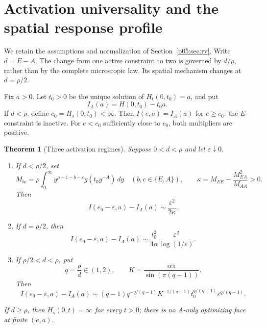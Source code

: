 \documentclass[11pt,letterpaper]{article}
\newtheorem{theorem}{Theorem}[section]
\theoremstyle{definition}
\theoremstyle{remark}
\newcommand{\1}{\mathbf 1}
\begin{document}
\section{Activation universality and the spatial response profile}
\label{p05:sec:activation}

We retain the assumptions and normalization of Section~\ref{p05:sec:rv}.
Write $d=E-A$. The change from one active constraint to two is governed
by $d/\rho$, rather than by the complete microscopic law. Its spatial
mechanism changes at $d=\rho/2$.

Fix $a>0$. Let $t_0>0$ be the unique solution of
$H_t(0,t_0)=a$, and put
\[
 I_A(a)=H(0,t_0)-t_0a.
\]
If $d<\rho$, define $e_0=H_s(0,t_0)<\infty$. Then
$I(e,a)=I_A(a)$ for $e\ge e_0$: the $E$-constraint is inactive.
For $e<e_0$ sufficiently close to $e_0$, both multipliers are positive.

\begin{theorem}[Three activation regimes]\label{p05:thm:activation}
Suppose $0<d<\rho$ and let $\varepsilon\downarrow0$.
\begin{enumerate}
\item If $d<\rho/2$, set
\[
 M_{bc}=\rho\int_0^\infty y^{\rho-1-b-c}
 g(t_0y^{-A})\,dy\quad(b,c\in\{E,A\}),\qquad
 \kappa=M_{EE}-\frac{M_{EA}^2}{M_{AA}}>0.
\]
Then
\[
 I(e_0-\varepsilon,a)-I_A(a)
 \sim\frac{\varepsilon^2}{2\kappa}.
\]
\item If $d=\rho/2$, then
\[
 I(e_0-\varepsilon,a)-I_A(a)
 \sim\frac{t_0^2}{4\alpha}
       \frac{\varepsilon^2}{\log(1/\varepsilon)}.
\]
\item If $\rho/2<d<\rho$, put
\[
 q=\frac{\rho}{d}\in(1,2),\qquad
 K=\frac{\alpha\pi}{\sin(\pi(q-1))}.
\]
Then
\begin{equation}\label{p05:eq:activation-fractional}
 I(e_0-\varepsilon,a)-I_A(a)
 \sim (q-1)q^{-q/(q-1)}
       K^{-1/(q-1)}t_0^{q/(q-1)}
       \varepsilon^{q/(q-1)}.
\end{equation}
\end{enumerate}
If $d\ge\rho$, then $H_s(0,t)=\infty$ for every $t>0$;
there is no $A$-only optimizing face at finite $(e,a)$.
\end{theorem}
\end{document}
